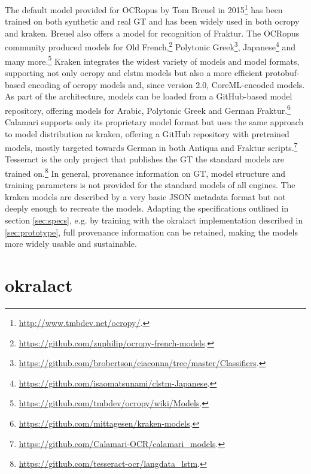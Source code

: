\documentclass[sigconf]{acmart}
\begin{document}
The default model provided for OCRopus by Tom Breuel in 2015\footnote{\url{http://www.tmbdev.net/ocropy/}.} has been trained on
both synthetic and real GT and has been widely used in both ocropy and kraken.
Breuel also offers a model for recognition of Fraktur. The OCRopus community
produced models for Old French,\footnote{\url{https://github.com/zuphilip/ocropy-french-models}.} Polytonic Greek\footnote{\url{https://github.com/brobertson/ciaconna/tree/master/Classifiers}.}, Japanese\footnote{\url{https://github.com/isaomatsunami/clstm-Japanese}.} and many more.\footnote{\url{https://github.com/tmbdev/ocropy/wiki/Models}.}
Kraken integrates the widest variety of models and model formats,
supporting not only ocropy and clstm models but also a more efficient
protobuf-based encoding of ocropy models and, since version 2.0, CoreML-encoded
models. As part of the architecture, models can be loaded from a GitHub-based
model repository, offering models for Arabic, Polytonic Greek and German Fraktur.\footnote{\url{https://github.com/mittagesen/kraken-models}.}
Calamari supports only its proprietary model format but uses the same approach
to model distribution as kraken, offering a GitHub repository with pretrained
models, mostly targeted towards German in both Antiqua and Fraktur scripts.\footnote{\url{https://github.com/Calamari-OCR/calamari_models}.}
Tesseract is the only project that publishes the GT the standard models are
trained on.\footnote{\url{https://github.com/tesseract-ocr/langdata_lstm}.} In general, provenance information on GT, model structure and training 
parameters is not provided for the standard models of all engines.
The kraken models are described by a very basic JSON metadata format but not
deeply enough to recreate the models. Adapting the specifications outlined
in section \ref{sec:specs}, e.g. by training with the okralact implementation
described in \ref{sec:prototype}, full provenance information can be retained,
making the models more widely usable and sustainable.


\section{okralact}
\label{sec:okralact}
\end{document}
